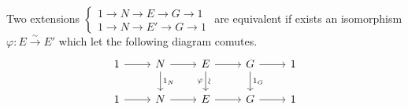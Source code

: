 \begin{definition}
  Two extensions $\begin{cases}
    1\to N\to E\to G\to 1 \\
    1\to N\to E'\to G\to 1
  \end{cases}$
  are equivalent if exists an isomorphism $\varphi: E \xrightarrow{\sim} E'$ which let the
  following diagram comutes.
  \[
    \begin{tikzcd}
      1 \arrow[r]
      & N \arrow[d, "1_N"] \arrow[r]
      & E \arrow[d, "\rotatebox{90}{\(\sim\)}", "\varphi"'] \arrow[r]
      & G \arrow[d, "1_G"] \arrow[r]
      & 1 \\
      1 \arrow[r] & N \arrow[r] & E \arrow[r] & G \arrow[r] & 1
    \end{tikzcd}
  \]
\end{definition}

